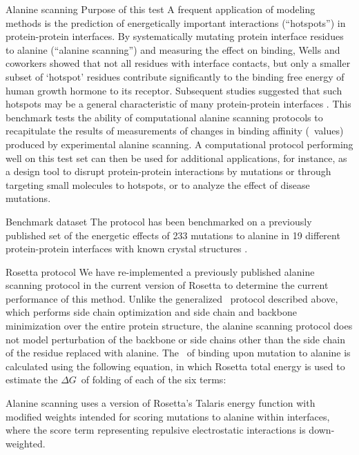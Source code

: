 Alanine scanning
Purpose of this test
A frequent application of modeling methods is the prediction of energetically important interactions (“hotspots”) in protein-protein interfaces. By systematically mutating protein interface residues to alanine (“alanine scanning”) and measuring the effect on binding, Wells and coworkers \cite{clackson_hot_1995} showed that not all residues with interface contacts, but only a smaller subset of ‘hotspot’ residues contribute significantly to the binding free energy of human growth hormone to its receptor. Subsequent studies suggested that such hotspots may be a general characteristic of many protein-protein interfaces \cite{bogan_anatomy_1998,darnell_kfc_2008,zhu_kfc2:_2011}. This benchmark tests the ability of computational alanine scanning protocols to recapitulate the results of measurements of changes in binding affinity (\ddg\ values) produced by experimental alanine scanning. A computational protocol performing well on this test set can then be used for additional applications, for instance, as a design tool to disrupt protein-protein interactions by mutations or through targeting small molecules to hotspots, or to analyze the effect of disease mutations.

Benchmark dataset
The protocol has been benchmarked on a previously published set of the energetic effects of 233 mutations to alanine in 19 different protein-protein interfaces with known crystal structures \cite{kortemme_simple_2002}.

Rosetta protocol
We have re-implemented a previously published alanine scanning protocol \cite{kortemme_simple_2002,kortemme_computational_2004} in the current version of Rosetta to determine the current performance of this method. Unlike the generalized \ddg\ protocol described above, which performs side chain optimization and side chain and backbone minimization over the entire protein structure, the alanine scanning protocol does not model perturbation of the backbone or side chains other than the side chain of the residue replaced with alanine.
The \ddg\ of binding upon mutation to alanine is calculated using the following equation, in which Rosetta total energy is used to estimate the $\Delta G$\ of folding of each of the six terms:



Alanine scanning uses a version of Rosetta’s Talaris energy function with modified weights intended for scoring mutations to alanine within interfaces, where the score term representing repulsive electrostatic interactions is down-weighted.

